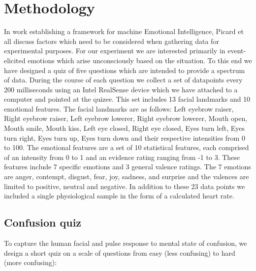 \documentclass[12pt,letterpaper]{article}
\begin{document}
\section{Methodology}
In work establishing a framework for machine Emotional Intelligence, Picard et all \cite{picard2001toward} discuss factors which need to be considered when gathering data for experimental purposes.  For our experiment we are interested primarily in event-elicited emotions which arise unconsciously based on the situation.  To this end we have designed a quiz of five questions which are intended to provide a spectrum of data.  During the course of each question we collect a set of datapoints every 200 milliseconds using an Intel RealSense device which we have attached to a computer and pointed at the quizee.  This set includes 13 facial landmarks and 10 emotional features.  The facial landmarks are as follows: Left eyebrow raiser, Right eyebrow raiser, Left eyebrow lowerer, Right eyebrow lowerer, Mouth open, Mouth smile, Mouth kiss, Left eye closed, Right eye closed, Eyes turn left, Eyes turn right, Eyes turn up, Eyes turn down and their respective intensities from 0 to 100.  The emotional features are a set of 10 statistical features, each comprised of an intensity from 0 to 1 and an evidence rating ranging from -1 to 3.  These features include 7 specific emotions and 3 general valence ratings.  The 7 emotions are anger, contempt, disgust, fear, joy, sadness, and surprise and the valences are limited to positive, neutral and negative.  In addition to these 23 data points we included a single physiological sample in the form of a calculated heart rate.

\subsection{Confusion quiz}

To capture the human facial and pulse response to mental state of confusion, we design a short quiz on a scale of questions from easy (less confusing) to hard (more confusing):
\end{document}
